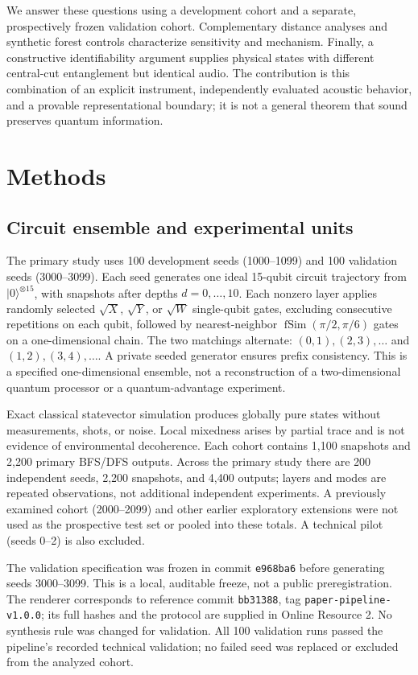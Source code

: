 \documentclass[pdflatex,iicol,sn-basic,Numbered]{sn-jnl}
\begin{document}
We answer these questions using a development cohort and a separate, prospectively frozen validation cohort. Complementary distance analyses and synthetic forest controls characterize sensitivity and mechanism. Finally, a constructive identifiability argument supplies physical states with different central-cut entanglement but identical audio. The contribution is this combination of an explicit instrument, independently evaluated acoustic behavior, and a provable representational boundary; it is not a general theorem that sound preserves quantum information.

\section{Methods}\label{sec:methods}
\subsection{Circuit ensemble and experimental units}
The primary study uses 100 development seeds (1000--1099) and 100 validation seeds (3000--3099). Each seed generates one ideal 15-qubit circuit trajectory from $|0\rangle^{\otimes15}$, with snapshots after depths $d=0,\ldots,10$. Each nonzero layer applies randomly selected $\sqrt X$, $\sqrt Y$, or $\sqrt W$ single-qubit gates, excluding consecutive repetitions on each qubit, followed by nearest-neighbor $\operatorname{fSim}(\pi/2,\pi/6)$ gates on a one-dimensional chain. The two matchings alternate: $(0,1),(2,3),\ldots$ and $(1,2),(3,4),\ldots$. A private seeded generator ensures prefix consistency. This is a specified one-dimensional ensemble, not a reconstruction of a two-dimensional quantum processor or a quantum-advantage experiment.

Exact classical statevector simulation produces globally pure states without measurements, shots, or noise. Local mixedness arises by partial trace and is not evidence of environmental decoherence. Each cohort contains 1,100 snapshots and 2,200 primary BFS/DFS outputs. Across the primary study there are 200 independent seeds, 2,200 snapshots, and 4,400 outputs; layers and modes are repeated observations, not additional independent experiments. A previously examined cohort (2000--2099) and other earlier exploratory extensions were not used as the prospective test set or pooled into these totals. A technical pilot (seeds 0--2) is also excluded.

The validation specification was frozen in commit \texttt{e968ba6} before generating seeds 3000--3099. This is a local, auditable freeze, not a public preregistration. The renderer corresponds to reference commit \texttt{bb31388}, tag \texttt{paper-pipeline-v1.0.0}; its full hashes and the protocol are supplied in Online Resource 2. No synthesis rule was changed for validation. All 100 validation runs passed the pipeline's recorded technical validation; no failed seed was replaced or excluded from the analyzed cohort.
\end{document}
